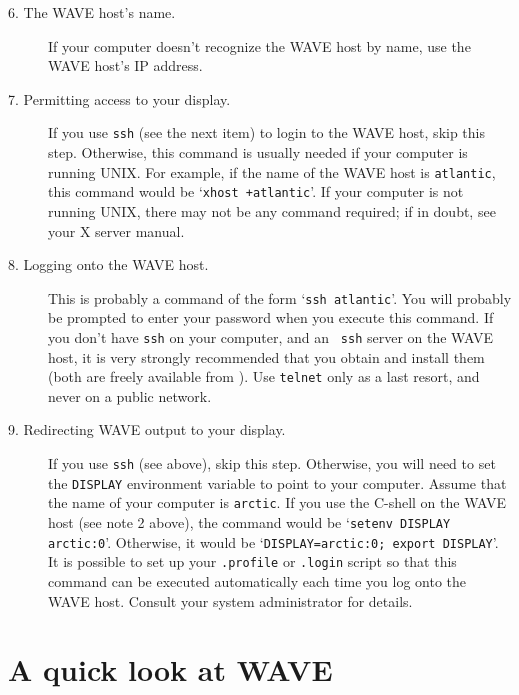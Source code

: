 \documentclass[twoside]{book}
\newcommand{\WAVE}{{\sf WAVE}\xspace}
\begin{document}
\begin{description}
\item[6. The \WAVE{} host's name.]
If your computer doesn't recognize the \WAVE{} host by name, use
the \WAVE{} host's IP address.

\item[7. Permitting access to your display.]
If you use {\tt ssh} (see the next item) to login to the \WAVE{} host,
skip this step.  Otherwise, this command is usually
needed if your computer is running UNIX.  For example, if the name of
the \WAVE{} host is {\tt atlantic}, this command would be `{\tt xhost
+atlantic}'.  If your computer is not running UNIX, there may not be
any command required; if in doubt, see your X server manual.

\item[8. Logging onto the \WAVE{} host.]

This is probably a command of the form `{\tt ssh atlantic}'.  You will
probably be prompted to enter your password when you execute this
command.  If you don't have {\tt ssh} on your computer, and an {\tt
ssh} server on the \WAVE{} host, it is very strongly recommended that you
obtain and install them (both are freely available from
).
Use {\tt telnet} only as a last resort, and never on a public network.

\item[9. Redirecting \WAVE{} output to your display.]
\label{sec:setting-display}
If you use {\tt ssh} (see above), skip this step.  Otherwise, you will
need to set the {\tt DISPLAY} environment variable to point to your
computer.  Assume that the name of your computer is {\tt arctic}.  If
you use the C-shell on the \WAVE{} host (see note 2 above), the
command would be `{\tt setenv DISPLAY arctic:0}'.  Otherwise, it would
be `{\tt DISPLAY=arctic:0; export DISPLAY}'.  It is possible to set up
your {\tt .profile} or {\tt .login} script so that this command can be
executed automatically each time you log onto the \WAVE{} host.
Consult your system administrator for details.

\end{description}

\newpage

\section{A quick look at \WAVE{}}
\end{document}

